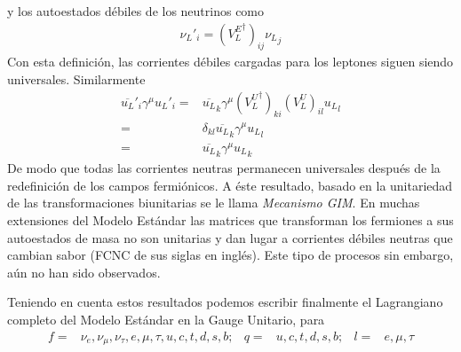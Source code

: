 y los autoestados d\'ebiles de los neutrinos como
\begin{align}
  {\nu_L}'_i=({V^E_L}^\dagger)_{ij}{\nu_L}_j
\end{align}
Con esta definici\'on, las corrientes d\'ebiles cargadas para los leptones siguen siendo universales. Similarmente
\begin{align}
   \overline{u_L}'_i \gamma^\mu{u_L}'_i=&\overline{u_L}_k\gamma^\mu({V^U_L}^\dagger)_{ki}(V^U_L)_{il} {u_L}_l\nonumber\\
  =&\delta_{kl}\overline{u_L}_k \gamma^\mu{u_L}_l\nonumber\\
  =&\overline{u_L}_k\gamma^\mu {u_L}_k
 \end{align}
De modo que todas las corrientes neutras permanecen universales despu\'es de la redefinici\'on de los campos fermi\'onicos. A \'este resultado, basado en la unitariedad de las transformaciones biunitarias se le llama \emph{Mecanismo GIM}. En muchas extensiones del Modelo Est\'andar las matrices que transforman los fermiones a sus autoestados de masa no son unitarias y dan lugar a corrientes d\'ebiles neutras que cambian sabor (FCNC de sus siglas en ingl\'es). Este tipo de procesos sin embargo, a\'un no han sido observados. 

\newpage{}

Teniendo en cuenta estos resultados podemos escribir finalmente el Lagrangiano completo del Modelo Est\'andar en la Gauge Unitario, para
\begin{align}
  f=&\nu_e,\nu_\mu,\nu_\tau,e,\mu,\tau,u,c,t,d,s,b;&q=&u,c,t,d,s,b;&l=&e,\mu,\tau
\end{align}

